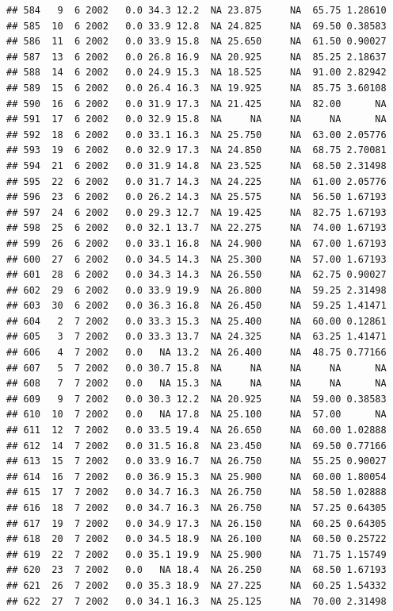 \documentclass[
]{book}
\begin{document}
\begin{verbatim}
## 584   9  6 2002   0.0 34.3 12.2  NA 23.875     NA  65.75 1.28610
## 585  10  6 2002   0.0 33.9 12.8  NA 24.825     NA  69.50 0.38583
## 586  11  6 2002   0.0 33.9 15.8  NA 25.650     NA  61.50 0.90027
## 587  13  6 2002   0.0 26.8 16.9  NA 20.925     NA  85.25 2.18637
## 588  14  6 2002   0.0 24.9 15.3  NA 18.525     NA  91.00 2.82942
## 589  15  6 2002   0.0 26.4 16.3  NA 19.925     NA  85.75 3.60108
## 590  16  6 2002   0.0 31.9 17.3  NA 21.425     NA  82.00      NA
## 591  17  6 2002   0.0 32.9 15.8  NA     NA     NA     NA      NA
## 592  18  6 2002   0.0 33.1 16.3  NA 25.750     NA  63.00 2.05776
## 593  19  6 2002   0.0 32.9 17.3  NA 24.850     NA  68.75 2.70081
## 594  21  6 2002   0.0 31.9 14.8  NA 23.525     NA  68.50 2.31498
## 595  22  6 2002   0.0 31.7 14.3  NA 24.225     NA  61.00 2.05776
## 596  23  6 2002   0.0 26.2 14.3  NA 25.575     NA  56.50 1.67193
## 597  24  6 2002   0.0 29.3 12.7  NA 19.425     NA  82.75 1.67193
## 598  25  6 2002   0.0 32.1 13.7  NA 22.275     NA  74.00 1.67193
## 599  26  6 2002   0.0 33.1 16.8  NA 24.900     NA  67.00 1.67193
## 600  27  6 2002   0.0 34.5 14.3  NA 25.300     NA  57.00 1.67193
## 601  28  6 2002   0.0 34.3 14.3  NA 26.550     NA  62.75 0.90027
## 602  29  6 2002   0.0 33.9 19.9  NA 26.800     NA  59.25 2.31498
## 603  30  6 2002   0.0 36.3 16.8  NA 26.450     NA  59.25 1.41471
## 604   2  7 2002   0.0 33.3 15.3  NA 25.400     NA  60.00 0.12861
## 605   3  7 2002   0.0 33.3 13.7  NA 24.325     NA  63.25 1.41471
## 606   4  7 2002   0.0   NA 13.2  NA 26.400     NA  48.75 0.77166
## 607   5  7 2002   0.0 30.7 15.8  NA     NA     NA     NA      NA
## 608   7  7 2002   0.0   NA 15.3  NA     NA     NA     NA      NA
## 609   9  7 2002   0.0 30.3 12.2  NA 20.925     NA  59.00 0.38583
## 610  10  7 2002   0.0   NA 17.8  NA 25.100     NA  57.00      NA
## 611  12  7 2002   0.0 33.5 19.4  NA 26.650     NA  60.00 1.02888
## 612  14  7 2002   0.0 31.5 16.8  NA 23.450     NA  69.50 0.77166
## 613  15  7 2002   0.0 33.9 16.7  NA 26.750     NA  55.25 0.90027
## 614  16  7 2002   0.0 36.9 15.3  NA 25.900     NA  60.00 1.80054
## 615  17  7 2002   0.0 34.7 16.3  NA 26.750     NA  58.50 1.02888
## 616  18  7 2002   0.0 34.7 16.3  NA 26.750     NA  57.25 0.64305
## 617  19  7 2002   0.0 34.9 17.3  NA 26.150     NA  60.25 0.64305
## 618  20  7 2002   0.0 34.5 18.9  NA 26.100     NA  60.50 0.25722
## 619  22  7 2002   0.0 35.1 19.9  NA 25.900     NA  71.75 1.15749
## 620  23  7 2002   0.0   NA 18.4  NA 26.250     NA  68.50 1.67193
## 621  26  7 2002   0.0 35.3 18.9  NA 27.225     NA  60.25 1.54332
## 622  27  7 2002   0.0 34.1 16.3  NA 25.125     NA  70.00 2.31498

\end{verbatim}
\end{document}
